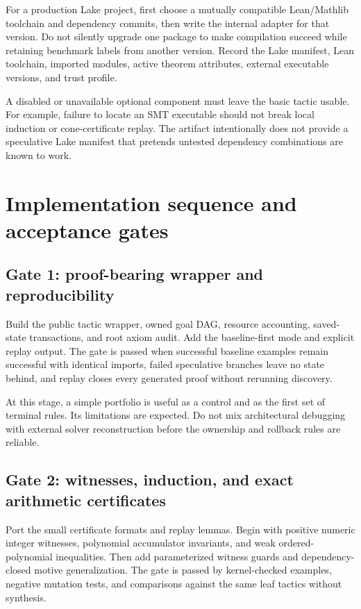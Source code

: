 \documentclass[11pt,a4paper]{article}
\begin{document}
For a production Lake project, first choose a mutually compatible Lean/Mathlib toolchain and dependency commits, then write the internal adapter for that version. Do not silently upgrade one package to make compilation succeed while retaining benchmark labels from another version. Record the Lake manifest, Lean toolchain, imported modules, active theorem attributes, external executable versions, and trust profile.

A disabled or unavailable optional component must leave the basic tactic usable. For example, failure to locate an SMT executable should not break local induction or cone-certificate replay. The artifact intentionally does not provide a speculative Lake manifest that pretends untested dependency combinations are known to work.

\section{Implementation sequence and acceptance gates}
\label{sec:roadmap}

\subsection{Gate 1: proof-bearing wrapper and reproducibility}

Build the public tactic wrapper, owned goal DAG, resource accounting, saved-state transactions, and root axiom audit. Add the baseline-first mode and explicit replay output. The gate is passed when successful baseline examples remain successful with identical imports, failed speculative branches leave no state behind, and replay closes every generated proof without rerunning discovery.

At this stage, a simple portfolio is useful as a control and as the first set of terminal rules. Its limitations are expected. Do not mix architectural debugging with external solver reconstruction before the ownership and rollback rules are reliable.

\subsection{Gate 2: witnesses, induction, and exact arithmetic certificates}

Port the small certificate formats and replay lemmas. Begin with positive numeric integer witnesses, polynomial accumulator invariants, and weak ordered-polynomial inequalities. Then add parameterized witness guards and dependency-closed motive generalization. The gate is passed by kernel-checked examples, negative mutation tests, and comparisons against the same leaf tactics without synthesis.
\end{document}
